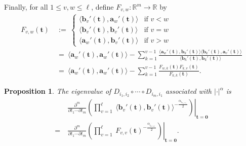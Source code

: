 \documentclass[12pt, reqno, oneside]{amsart}
\newtheorem{proposition}[corollary]{Proposition}
\numberwithin{equation}{section}
\begin{document}
Finally, for all $1 \leq v,w \leq \ell$, define $F_{v,w} : \mathbb{R}^m \to \mathbb{R}$ by 
\begin{align}
\nonumber
F_{v,w}(\mathbf{t}) \ &:= \ \begin{cases}
\langle \mathbf{b}_v'(\mathbf{t}), \mathbf{a}_w'(\mathbf{t}) \rangle & \text{if } v < w \\
\langle \mathbf{b}_v'(\mathbf{t}), \mathbf{b}_v'(\mathbf{t}) \rangle & \text{if } v = w \\
\langle \mathbf{a}_w'(\mathbf{t}), \mathbf{b}_v'(\mathbf{t}) \rangle & \text{if } v > w
\end{cases} \\
\nonumber
&= \ \langle \mathbf{a}_w'(\mathbf{t}), \mathbf{a}_w'(\mathbf{t}) \rangle - \sum_{k=1}^{v-1} \frac{\langle  \mathbf{a}_w'(\mathbf{t}), \mathbf{b}_k'(\mathbf{t}) \rangle \langle \mathbf{b}_k'(\mathbf{t}), \mathbf{a}_v'(\mathbf{t}) \rangle}{\langle \mathbf{b}_k'(\mathbf{t}), \mathbf{b}_k'(\mathbf{t}) \rangle}  \\
\label{eq:recursive-variables}
&= \ \langle \mathbf{a}_w'(\mathbf{t}), \mathbf{a}_w'(\mathbf{t}) \rangle - \sum_{k=1}^{v-1} \frac{F_{w,k}(\mathbf{t}) F_{k,v}(\mathbf{t})}{F_{k,k}(\mathbf{t})}.
\end{align} 

\begin{proposition}
The eigenvalue of $D_{i_1,i_2}\circ\cdots\circ D_{i_m,i_1}$ associated with $|\cdot|^\alpha$ is
\begin{align}
\nonumber
&\left.\frac{\partial^m}{\partial t_1\cdots\partial t_m}\left(\prod_{v=1}^\ell \ \langle \mathbf{b}_v'(\mathbf{t}) ,\mathbf{b}_v'(\mathbf{t}) \rangle^{-\frac{\alpha_{i_{\sigma(v)}}}{2}}\right)\right\rvert_{\mathbf{t}=\mathbf{0}}\\
\label{elementary-eigenvalue-3}
= \ & \left.\frac{\partial^m}{\partial t_1\cdots\partial t_m}\left(\prod_{v=1}^\ell \ F_{v,v}(\mathbf{t})^{-\frac{\alpha_{i_{\sigma(v)}}}{2}}\right)\right\rvert_{\mathbf{t}=\mathbf{0}}.
\end{align} 
\end{proposition}
\end{document}
